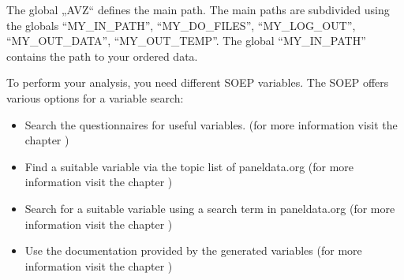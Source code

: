 \documentclass[letterpaper,10pt,openany,onesideH,english]{sphinxmanual}
\begin{document}
The global „AVZ“ defines the main path. The main paths are subdivided using the globals “MY\_IN\_PATH”, “MY\_DO\_FILES”, “MY\_LOG\_OUT”, “MY\_OUT\_DATA”, “MY\_OUT\_TEMP”. The global “MY\_IN\_PATH” contains the path to your ordered data.


To perform your analysis, you need different SOEP variables. The SOEP offers various options for a variable search:
\begin{itemize}
\item {} 
Search the questionnaires for useful variables. (for more information visit the chapter {\hyperref[\detokenize{Working with SOEP Documentation/index:quest-search}]{}})

\item {} 
Find a suitable variable via the topic list of paneldata.org (for more information visit the chapter {\hyperref[\detokenize{Working with SOEP Documentation/index:topic}]{}})

\item {} 
Search for a suitable variable using a search term in paneldata.org (for more information visit the chapter {\hyperref[\detokenize{Working with SOEP Documentation/index:var-search}]{}})

\item {} 
Use the documentation provided by the generated variables (for more information visit the chapter {\hyperref[\detokenize{Working with SOEP Documentation/index:documentation}]{}})

\end{itemize}
\end{document}
